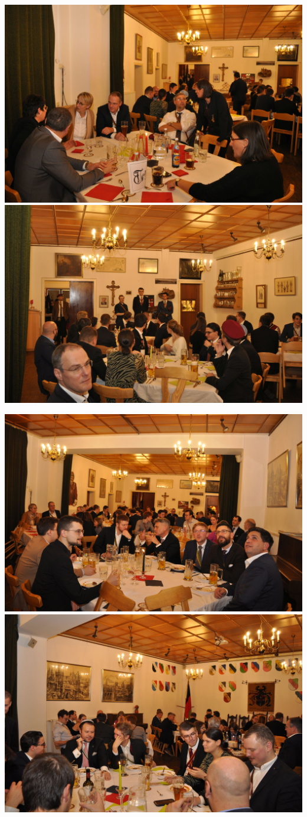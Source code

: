 	\begin{figurehere}
		
			\includegraphics[width=.45\linewidth]{Bilder/begrüßungsabend/Begrüßungsabend-WS2022 (1).JPG}
		   	\includegraphics[width=.45\linewidth]{Bilder/begrüßungsabend/Begrüßungsabend-WS2022 (2).JPG}
		   	
		   		\includegraphics[width=.45\linewidth]{Bilder/begrüßungsabend/Begrüßungsabend-WS2022 (3).JPG}
		   			\includegraphics[width=.45\linewidth]{Bilder/begrüßungsabend/Begrüßungsabend-WS2022 (4).JPG}
		   
		   
		    
	\end{figurehere}
	

	

%
